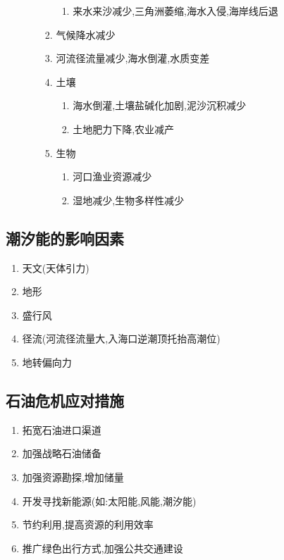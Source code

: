 \documentclass[a4paper]{article}
\begin{document}
\begin{enumerate}
\begin{enumerate}
\begin{enumerate}
\begin{enumerate}
                    \item 来水来沙减少,三角洲萎缩,海水入侵,海岸线后退
                \end{enumerate}
                \item 气候降水减少
                \item 河流径流量减少,海水倒灌,水质变差
                \item 土壤
                \begin{enumerate}
                    \item 海水倒灌,土壤盐碱化加剧,泥沙沉积减少
                    \item 土地肥力下降,农业减产
                \end{enumerate}
                \item 生物
                \begin{enumerate}
                    \item 河口渔业资源减少
                    \item 湿地减少,生物多样性减少
                \end{enumerate}
            \end{enumerate}
        \end{enumerate}
    \end{enumerate}
    \subsection{潮汐能的影响因素}
    \begin{enumerate}
        \item 天文(天体引力)
        \item 地形
        \item 盛行风
        \item 径流(河流径流量大,入海口逆潮顶托抬高潮位)
        \item 地转偏向力
    \end{enumerate}
    \subsection{石油危机应对措施}
    \begin{enumerate}
        \item 拓宽石油进口渠道
        \item 加强战略石油储备
        \item 加强资源勘探,增加储量
        \item 开发寻找新能源(如:太阳能,风能,潮汐能)
        \item 节约利用,提高资源的利用效率
        \item 推广绿色出行方式,加强公共交通建设
    \end{enumerate}
\end{document}
